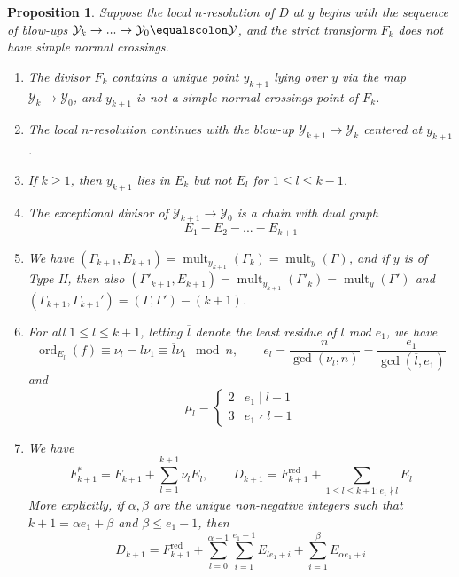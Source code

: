 \documentclass[12pt]{amsart}
\numberwithin{equation}{section}
\newtheorem{prop}[equation]{Proposition}
\theoremstyle{definition}
\renewcommand{\c}[1]{\overline{#1}}
\newcommand{\Y}{\mathcal{Y}}
\DeclareMathOperator{\red}{red}
\DeclareMathOperator{\mult}{mult}
\DeclareMathOperator{\ord}{ord}
\begin{document}
\begin{prop}\label{prop: structure of exceptional divisor}
    Suppose the local $n$-resolution of $D$ at $y$ begins with the  sequence of blow-ups $\Y_k\to...\to\Y_0\equalscolon\Y$, and the strict transform $F_k$ does not have simple normal crossings.
    \begin{enumerate}[\upshape (i)]
        \item The divisor $F_k$ contains a unique point $y_{k+1}$ lying over $y$ via the map $\Y_k\to\Y_0$, and $y_{k+1}$ is not a simple normal crossings point of $F_k$.
        \item The local $n$-resolution continues with the blow-up $\Y_{k+1}\to\Y_k$ centered at $y_{k+1}$. 
        \item If $k\geq 1$, then $y_{k+1}$ lies in $E_k$ but not $E_l$ for $1\leq l\leq k-1$. 
        \item The exceptional divisor of $\Y_{k+1}\to\Y_0$ is a chain with dual graph \[E_1-E_2-...-E_{k+1}\]
        \item We have $(\Gamma_{k+1},E_{k+1})=\mult_{y_{k+1}}(\Gamma_k)=\mult_y(\Gamma)$,
        and if $y$ is of Type II, then also $(\Gamma'_{k+1},E_{k+1})=\mult_{y_{k+1}}(\Gamma'_k)=\mult_y(\Gamma')$ and
        $(\Gamma_{k+1},\Gamma_{k+1}')=(\Gamma,\Gamma')-(k+1)$.
        \item For all $1\leq l\leq k+1$, letting $\c{l}$ denote the least residue of $l$ mod $e_1$, we have
        \[\ord_{E_l}(f)\equiv \nu_l=l\nu_1\equiv\c{l}\nu_1\mod n,\quad\quad e_l=\frac{n}{\gcd(\nu_{l},n)}=\frac{e_1}{\gcd(\c{l},e_1)}\]
        and \[\mu_l=\begin{cases}2&e_1\mid l-1\\3&e_1\nmid l-1\end{cases}\]
        \item We have \[F_{k+1}^*=F_{k+1}+\sum_{l=1}^{k+1} \nu_l E_l,\quad\quad D_{k+1}=F_{k+1}^{\red}+\sum_{1\leq l\leq k+1:e_1\nmid l} E_l\]
        More explicitly, if $\alpha,\beta$ are the unique non-negative integers such that $k+1=\alpha e_1+\beta$ and $\beta\leq e_1-1$, then 
         \[D_{k+1}=F_{k+1}^{\red}+\sum_{l=0}^{\alpha-1}\sum_{i=1}^{e_1-1} E_{le_1+i}+\sum_{i=1}^\beta E_{\alpha e_1+i}\]
    \end{enumerate}
\end{prop}
\end{document}
